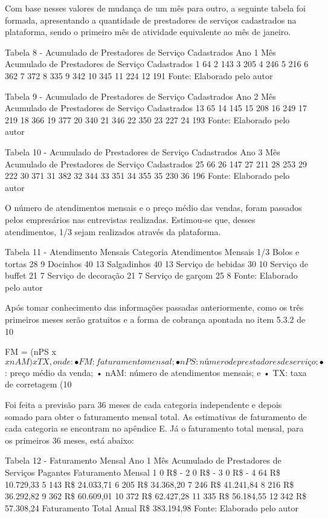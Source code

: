 Com base nesses valores de mudança de um mês para outro, a seguinte tabela foi formada, apresentando a quantidade de prestadores de serviços cadastrados na plataforma, sendo o primeiro mês de atividade equivalente ao mês de janeiro. 

Tabela 8 - Acumulado de Prestadores de Serviço Cadastrados Ano 1 
Mês	Acumulado de Prestadores de Serviço Cadastrados
1	64
2	143
3	205
4	246
5	216
6	362
7	372
8	335
9	342
10	345
11	224
12	191
Fonte: Elaborado pelo autor 

Tabela 9 - Acumulado de Prestadores de Serviço Cadastrados Ano 2 
Mês	Acumulado de Prestadores de Serviço Cadastrados
13	65
14	145
15	208
16	249
17	219
18	366
19	377
20	340
21	346
22	350
23	227
24	193
Fonte: Elaborado pelo autor 

Tabela 10 - Acumulado de Prestadores de Serviço Cadastrados Ano 3 
Mês	Acumulado de Prestadores de Serviço Cadastrados
25	66
26	147
27	211
28	253
29	222
30	371
31	382
32	344
33	351
34	355
35	230
36	196
Fonte: Elaborado pelo autor 

O número de atendimentos mensais e o preço médio das vendas, foram passados pelos empresários nas entrevistas realizadas. Estimou-se que, desses atendimentos, 1/3 sejam realizados através da plataforma. 

Tabela 11 - Atendimento Mensais 
Categoria	Atendimentos Mensais	 1/3
Bolos e tortas	28	9
Docinhos	40	13
Salgadinhos	40	13
Serviço de bebidas	30	10
Serviço de buffet	21	7
Serviço de decoração	21	7
Serviço de garçom	25	8
Fonte: Elaborado pelo autor 

Após tomar conhecimento das informações passadas anteriormente, como os três primeiros meses serão gratuitos e a forma de cobrança apontada no item 5.3.2 de 10%


FM = (nPS x $ x nAM) x TX, onde: 
•	FM: faturamento mensal; 
•	nPS: número de prestadores de serviço; 
•	$: preço médio da venda; 
•	nAM: número de atendimentos mensais; e 
•	TX: taxa de corretagem (10%

Foi feita a previsão para 36 meses de cada categoria independente e depois somado para obter o faturamento mensal total. As estimativas de faturamento de cada categoria se encontram no apêndice E. Já o faturamento total mensal, para os primeiros 36 meses, está abaixo: 

Tabela 12 - Faturamento Mensal Ano 1 
Mês	Acumulado de Prestadores de Serviços Pagantes	Faturamento Mensal
1	0	R\$                 -
2	0	R\$                 -
3	0	R\$                 -
4	64	R\$     10.729,33
5	143	R\$     24.033,71
6	205	R\$     34.368,20
7	246	R\$     41.241,84
8	216	R\$     36.292,82
9	362	R\$     60.609,01
10	372	R\$     62.427,28
11	335	R\$     56.184,55
12	342	R\$     57.308,24
Faturamento Total Anual	R\$  383.194,98
Fonte: Elaborado pelo autor 

